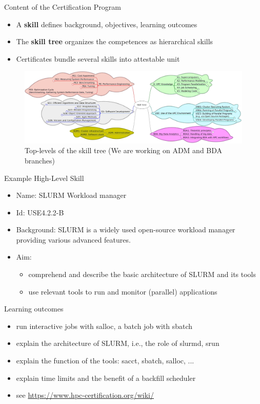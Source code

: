 \documentclass[compress,aspectratio=169]{beamer}
\begin{document}
\begin{frame}{Content of the Certification Program}
	\begin{itemize}
		\item A \textbf{skill} defines background, objectives, learning outcomes
		\item The \textbf{skill tree} organizes the competences as hierarchical skills
		\item Certificates bundle several skills into attestable unit
	\end{itemize}

	\begin{figure}
		\includegraphics[width=\textwidth]{skill-tree}
		\vspace*{-2em}
		\caption{Top-levels of the skill tree (We are working on ADM and BDA branches)}
	\end{figure}
\end{frame}


\begin{frame}{Example High-Level Skill}

\begin{itemize}
\item Name: SLURM Workload manager
\item Id: USE4.2.2-B
\item Background: {\small SLURM is a widely used open-source workload
manager providing various advanced features.}
\item Aim:
\begin{itemize}
\item comprehend and describe the basic architecture of SLURM and its tools
\item use relevant tools to run and monitor (parallel) applications
\end{itemize}
\end{itemize}

\begin{block}{Learning outcomes}
\begin{itemize}
\item run interactive jobs with salloc, a batch job with sbatch
\item explain the architecture of SLURM, i.e., the role of slurmd, srun
\item explain the function of the tools: sacct, sbatch, salloc, ...
\item explain time limits and the benefit of a backfill scheduler
\item see \url{https://www.hpc-certification.org/wiki/}
\end{itemize}
\end{block}
\end{frame}
\end{document}
